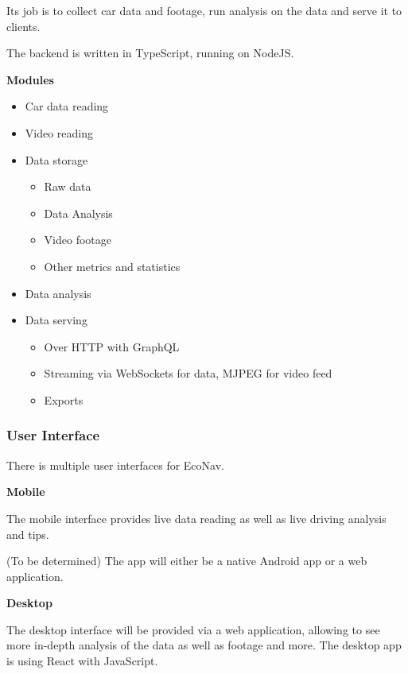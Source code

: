 \documentclass[a4paper,12pt]{article}
\begin{document}
Its job is to collect car data and footage, run analysis on the data and serve it to clients.

The backend is written in TypeScript, running on NodeJS.

\textbf{Modules}
\begin{itemize}
	\item Car data reading
	\item Video reading
	\item Data storage
	\begin{itemize}
		\item Raw data
		\item Data Analysis
		\item Video footage
		\item Other metrics and statistics
	\end{itemize}
	\item Data analysis
	\item Data serving
	\begin{itemize}
		\item Over HTTP with GraphQL
		\item Streaming via WebSockets for data, MJPEG for video feed
		\item Exports
	\end{itemize}
\end{itemize}

\pagebreak

\subsubsection{User Interface}
There is multiple user interfaces for EcoNav.

\textbf{Mobile}

The mobile interface provides live data reading as well as live driving analysis and tips.

(To be determined) The app will either be a native Android app or a web application.

\textbf{Desktop}

The desktop interface will be provided via a web application, allowing to see more in-depth analysis of the data as well as footage and more. The desktop app is using React with JavaScript.
\end{document}
